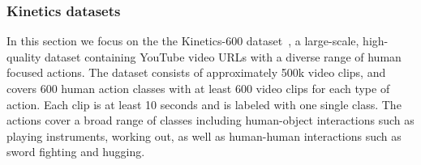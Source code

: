 \documentclass[10pt,twocolumn,letterpaper]{article}
\begin{document}
\subsubsection{Kinetics datasets} 
 In this section we focus on the 
the Kinetics-600 dataset~\cite{carreira2017quo}, a large-scale, high-quality dataset containing YouTube video URLs with 
a diverse range of human focused actions. The dataset consists of approximately 500k video clips, and covers 600 human action classes with at least 600 video clips for each type of action. Each clip is at least 10 seconds and is labeled with one single class. The actions cover a broad range of classes including human-object interactions such as playing instruments, working out, as well as human-human interactions such as sword fighting and hugging.

\begin{table}[t!]
\end{table}
\end{document}
